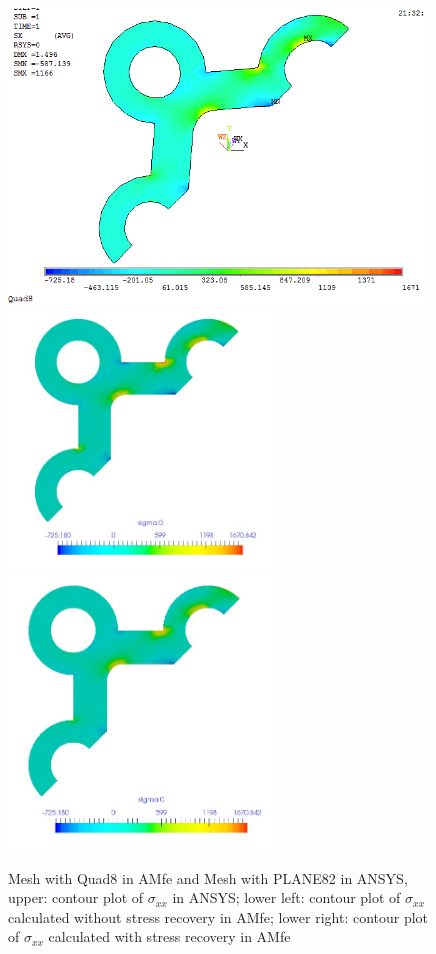 \begin{figure}[htbp]
	\begin{center}
		\includegraphics[width=11cm,clip]{Quad8_Sxx.png} 
		\includegraphics[width=7cm,clip]{Quad8_Sxx_PD.png} 			
		\includegraphics[width=7cm,clip]{Quad8_Sxx_P.png} 		
		\caption{Mesh with Quad8 in AMfe and Mesh with PLANE82 in ANSYS, upper: contour plot of $\sigma_{xx}$ in ANSYS; lower left: contour plot of $\sigma_{xx}$ calculated without stress recovery in AMfe; lower right: contour plot of $\sigma_{xx}$ calculated with stress recovery in AMfe} \label{fig: Quad8_Sxx}
	\end{center}
\end{figure}
\clearpage 

